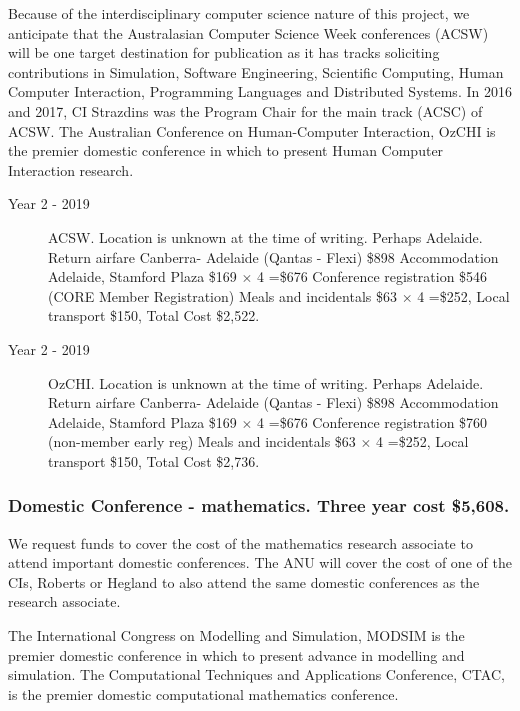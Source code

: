 \documentclass[a4paper,twoside,12pt,compact]{article}
\begin{document}
Because of the interdisciplinary computer science nature of this project, we anticipate that the Australasian Computer Science Week conferences (ACSW) will be one target destination for publication as it has tracks soliciting contributions in Simulation, Software Engineering, Scientific Computing, Human Computer Interaction, Programming Languages and Distributed Systems. In 2016 and 2017, CI Strazdins was the Program Chair for the main track (ACSC) of ACSW. 
The Australian Conference on Human-Computer Interaction, OzCHI is the premier domestic conference in which to present Human Computer Interaction research. 

\begin{description}


\item[Year 2 - 2019] ACSW.
Location is unknown at the time of writing. Perhaps Adelaide.
Return airfare Canberra- Adelaide (Qantas - Flexi) \$898
Accommodation Adelaide, Stamford Plaza \$169 $\times$ 4 =\$676
Conference registration \$546 (CORE Member Registration)
Meals and incidentals \$63 $\times$ 4 =\$252, Local transport \$150, 
Total Cost \$2,522.

\item[Year 2 - 2019] OzCHI.
Location is unknown at the time of writing. Perhaps Adelaide.
Return airfare Canberra- Adelaide (Qantas - Flexi) \$898
Accommodation Adelaide, Stamford Plaza \$169 $\times$ 4 =\$676
Conference registration \$760 (non-member early reg)
Meals and incidentals \$63 $\times$ 4 =\$252, Local transport \$150, 
Total Cost \$2,736.




\end{description}



\subsubsection*{Domestic Conference - mathematics. Three year cost \$5,608.}

We request funds to cover the cost of the mathematics research associate to attend important domestic conferences.  The ANU will cover the cost of one of the CIs, Roberts or Hegland to also attend the same domestic conferences as the research associate. 

The International Congress on Modelling and Simulation, MODSIM is the premier domestic conference in which to present advance in modelling and simulation. 
The Computational Techniques and Applications Conference, CTAC, is the premier domestic computational mathematics conference.
\end{document}
